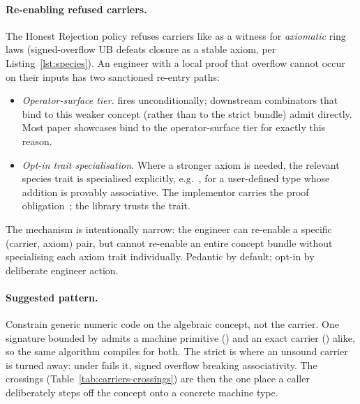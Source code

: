 \documentclass[11pt, a4paper]{article}
\begin{document}
\paragraph{Re-enabling refused carriers.}  The Honest Rejection
policy refuses carriers like  as a witness for
\emph{axiomatic} ring laws (signed-overflow UB defeats closure as a
stable axiom, per Listing~\ref{lst:species}).  An engineer with a
local proof that overflow cannot occur on their inputs has two
sanctioned re-entry paths:

\begin{itemize}
\item \emph{Operator-surface tier.}  
fires unconditionally; downstream combinators that bind to this
weaker concept (rather than to the strict  bundle)
admit  directly.  Most paper showcases bind to the
operator-surface tier for exactly this reason.
\item \emph{Opt-in trait specialisation.}  Where a stronger axiom is
needed, the relevant species trait is specialised explicitly, e.g.\ , for a user-defined type whose addition is provably associative.
The implementor carries the proof obligation~\cite{nspe_ethics}; the library trusts the trait.
\end{itemize}

The mechanism is intentionally narrow: the engineer can re-enable a
specific (carrier, axiom) pair, but cannot re-enable an entire
concept bundle without specialising each axiom trait individually.
Pedantic by default; opt-in by deliberate engineer action.

\paragraph{Suggested pattern.}
Constrain generic numeric code on the algebraic concept, not the carrier.
One signature bounded by  admits a machine primitive () and an exact carrier () alike, so the same algorithm compiles for both.
The strict  is where an unsound carrier is turned away:  under \cppinline{+} fails it, signed overflow breaking associativity.
The crossings (Table~\ref{tab:carriers-crossings}) are then the one place a caller deliberately steps off the concept onto a concrete machine type.
\end{document}

